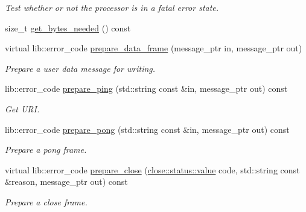 \begin{DoxyCompactItemize}
\begin{DoxyCompactList}\small\item\em Test whether or not the processor is in a fatal error state. \end{DoxyCompactList}\item 
size\+\_\+t \hyperlink{classwebsocketpp_1_1processor_1_1hybi13_a0e7fbb706a341f7d125c27e7ef001d92}{get\+\_\+bytes\+\_\+needed} () const
\item 
virtual lib\+::error\+\_\+code \hyperlink{classwebsocketpp_1_1processor_1_1hybi13_a72f4833d66eb51e37a956f434895b3ab}{prepare\+\_\+data\+\_\+frame} (message\+\_\+ptr in, message\+\_\+ptr out)
\begin{DoxyCompactList}\small\item\em Prepare a user data message for writing. \end{DoxyCompactList}\item 
lib\+::error\+\_\+code \hyperlink{classwebsocketpp_1_1processor_1_1hybi13_a38d06bc30c10cd1947c9a7b3051f8961}{prepare\+\_\+ping} (std\+::string const \&in, message\+\_\+ptr out) const\hypertarget{classwebsocketpp_1_1processor_1_1hybi13_a38d06bc30c10cd1947c9a7b3051f8961}{}\label{classwebsocketpp_1_1processor_1_1hybi13_a38d06bc30c10cd1947c9a7b3051f8961}

\begin{DoxyCompactList}\small\item\em Get U\+RI. \end{DoxyCompactList}\item 
lib\+::error\+\_\+code \hyperlink{classwebsocketpp_1_1processor_1_1hybi13_ab5ca972653c126e7c6a05c529b394321}{prepare\+\_\+pong} (std\+::string const \&in, message\+\_\+ptr out) const
\begin{DoxyCompactList}\small\item\em Prepare a pong frame. \end{DoxyCompactList}\item 
virtual lib\+::error\+\_\+code \hyperlink{classwebsocketpp_1_1processor_1_1hybi13_a8cbb98af828463c5ef80429a7ade715d}{prepare\+\_\+close} (\hyperlink{namespacewebsocketpp_1_1close_1_1status_a8614a5c4733d708e2d2a32191c5bef84}{close\+::status\+::value} code, std\+::string const \&reason, message\+\_\+ptr out) const
\begin{DoxyCompactList}\small\item\em Prepare a close frame. \end{DoxyCompactList}\end{DoxyCompactItemize}
